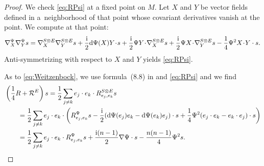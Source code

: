 \documentclass[pdftex]{sigma}
\numberwithin{equation}{section}
\begin{document}
\begin{proof}
We check \eqref{eq:RPsi} at a fixed point on $M$. Let $X$ and $Y$ be vector fields defined in a~neighborhood of that point whose covariant derivatives vanish at the point. We compute at that point:
\begin{align*}
\nabla^\Psi_X \nabla^\Psi_Y s
=
\nabla^{S \otimes E}_X \nabla^{S \otimes E}_Y s + \frac{\rm i}{2} {\rm d}\Psi(X)Y\!\cdot\! s + \frac{\rm i}{2} \Psi Y \!\cdot\! \nabla^{S \otimes E}_X s + \frac{\rm i}{2} \Psi X \!\cdot\! \nabla^{S \otimes E}_Y s
 - \frac{1}{4} \Psi^2 X \!\cdot\! Y\cdot s.
\end{align*}
Anti-symmetrizing with respect to $X$ and $Y$ yields \eqref{eq:RPsi}.

As to \eqref{eq:Weitzenbock}, we use formula~(8.8) in \cite[Chapter~II]{Lawson-Michelsohn} and \eqref{eq:RPsi} and we find
\begin{align*}
&\left(\frac{1}{4} R + \mathcal{R}^E\right)s =
\frac{1}{2} \sum_{j \neq k} e_j\cdot e_k\cdot R^{S \otimes E}_{e_j,e_k} s \\
&\qquad=
\frac{1}{2} \sum_{j \neq k} e_j\cdot e_k\cdot \left( R^\Psi_{e_j,e_k} s - \frac{\rm i}{2} ({\rm d}\Psi(e_j)e_k-{\rm d}\Psi(e_k)e_j) \cdot s + \frac{1}{4} \Psi^2 (e_j\cdot e_k-e_k\cdot e_j) \cdot s \right) \\
&\qquad=
\frac{1}{2} \sum_{j \neq k} e_j\cdot e_k\cdot R^\Psi_{e_j,e_k} s + \frac{{\rm i}(n-1)}{2} \nabla\Psi \cdot s - \frac{n(n-1)}{4} \Psi^2 s.\tag*{\qed}
\end{align*} \renewcommand{\qed}{}
\end{proof}
\end{document}
